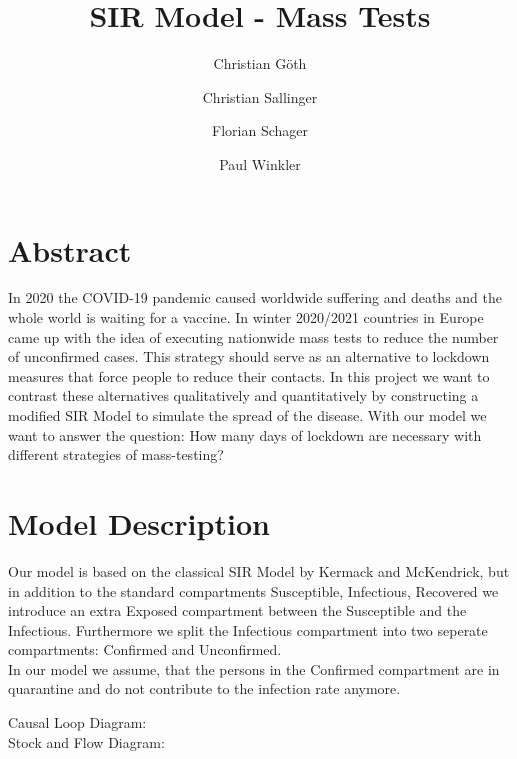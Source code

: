 \documentclass[a4paper,11pt]{scrartcl}
\begin{document}
\subject{Modeling \& Simulation}
\title{SIR Model - Mass Tests}

\publishers{Betreuer: Martin Bicher }


\author{
Christian Göth \and
Christian Sallinger \and
Florian Schager \and
Paul Winkler
}

\maketitle

\section*{Abstract}

In 2020 the COVID-19 pandemic caused worldwide suffering and deaths and the
whole world is waiting for a vaccine. In winter 2020/2021 countries in Europe
came up with the idea of executing nationwide mass tests to reduce the number
of unconfirmed cases. This strategy should serve as an alternative to
lockdown measures that force people to reduce their contacts.
In this project we want to contrast these alternatives qualitatively and quantitatively
by constructing a modified SIR Model to simulate the spread of the disease.
With our model we want to answer the question:
How many days of lockdown are necessary with different strategies of mass-testing?


\newpage

\tableofcontents

\newpage

\section{Model Description}

Our model is based on the classical SIR Model by Kermack and McKendrick,
but in addition to the standard compartments Susceptible, Infectious, Recovered
we introduce an extra Exposed compartment between the Susceptible and the Infectious.
Furthermore we split the Infectious compartment into two seperate compartments:
Confirmed and Unconfirmed. \\
In our model we assume, that the persons in the Confirmed compartment are in
quarantine and do not contribute to the infection rate anymore.



Causal Loop Diagram: \\


Stock and Flow Diagram: \\
\end{document}
